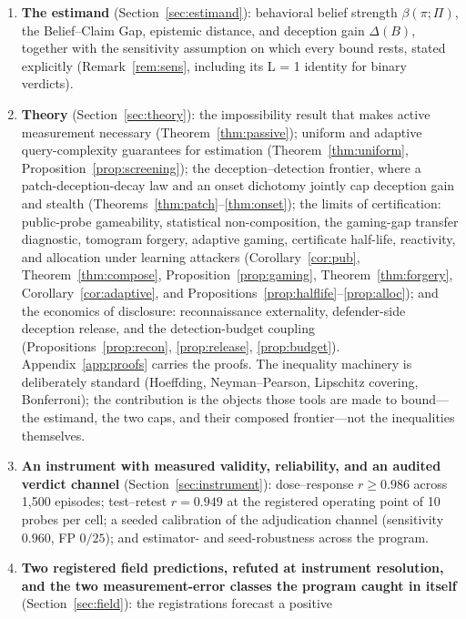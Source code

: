 \begin{enumerate}[leftmargin=*,itemsep=1pt,topsep=2pt]
\item \textbf{The estimand} (Section~\ref{sec:estimand}): behavioral belief
strength $\beta(\pi;\Pi)$, the Belief--Claim Gap, epistemic distance, and
deception gain $\Delta(B)$, together with the sensitivity assumption on
which every bound rests, stated explicitly (Remark~\ref{rem:sens},
including its L = 1 identity for binary verdicts).
\item \textbf{Theory} (Section~\ref{sec:theory}): the impossibility result
that makes active measurement necessary (Theorem~\ref{thm:passive}); uniform
and adaptive query-complexity guarantees for estimation
(Theorem~\ref{thm:uniform}, Proposition~\ref{prop:screening}); the
deception--detection frontier, where a patch-deception-decay law and an onset
dichotomy jointly cap deception gain and stealth
(Theorems~\ref{thm:patch}--\ref{thm:onset}); the limits of certification:
public-probe gameability, statistical non-composition, the gaming-gap
transfer diagnostic, tomogram forgery, adaptive gaming, certificate
half-life, reactivity, and allocation under learning attackers
(Corollary~\ref{cor:pub}, Theorem~\ref{thm:compose},
Proposition~\ref{prop:gaming}, Theorem~\ref{thm:forgery},
Corollary~\ref{cor:adaptive}, and
Propositions~\ref{prop:halflife}--\ref{prop:alloc}); and the economics of
disclosure: reconnaissance externality, defender-side deception release,
and the detection-budget coupling (Propositions~\ref{prop:recon},
\ref{prop:release}, \ref{prop:budget}). Appendix~\ref{app:proofs} carries
the proofs. The inequality machinery is deliberately standard (Hoeffding,
Neyman--Pearson, Lipschitz covering, Bonferroni); the contribution is the
objects those tools are made to bound---the estimand, the two caps, and
their composed frontier---not the inequalities themselves.
\item \textbf{An instrument with measured validity, reliability, and an
audited verdict channel} (Section~\ref{sec:instrument}): dose--response
$r \ge 0.986$ across 1{,}500 episodes; test--retest $r = 0.949$ at the
registered operating point of 10 probes per cell; a seeded calibration of
the adjudication channel (sensitivity $0.960$, FP $0/25$); and
estimator- and seed-robustness across the program.
\item \textbf{Two registered field predictions, refuted at instrument
resolution, and the two measurement-error classes the program caught in
itself} (Section~\ref{sec:field}): the registrations forecast a positive

\end{enumerate}
